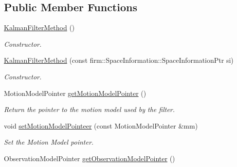 \subsection*{\-Public \-Member \-Functions}
\begin{DoxyCompactItemize}
\item 
\hypertarget{class_kalman_filter_method_a1a3da9af1c9f982195c064c042feab8e}{\hyperlink{class_kalman_filter_method_a1a3da9af1c9f982195c064c042feab8e}{\-Kalman\-Filter\-Method} ()}\label{class_kalman_filter_method_a1a3da9af1c9f982195c064c042feab8e}

\begin{DoxyCompactList}\small\item\em \-Constructor. \end{DoxyCompactList}\item 
\hypertarget{class_kalman_filter_method_a62fd5955112a15d0c5efd1cb0c9601d5}{\hyperlink{class_kalman_filter_method_a62fd5955112a15d0c5efd1cb0c9601d5}{\-Kalman\-Filter\-Method} (const firm\-::\-Space\-Information\-::\-Space\-Information\-Ptr si)}\label{class_kalman_filter_method_a62fd5955112a15d0c5efd1cb0c9601d5}

\begin{DoxyCompactList}\small\item\em \-Constructor. \end{DoxyCompactList}\item 
\hypertarget{class_kalman_filter_method_aed467f00719c58d7be5458f8f99511d9}{\-Motion\-Model\-Pointer \hyperlink{class_kalman_filter_method_aed467f00719c58d7be5458f8f99511d9}{get\-Motion\-Model\-Pointer} ()}\label{class_kalman_filter_method_aed467f00719c58d7be5458f8f99511d9}

\begin{DoxyCompactList}\small\item\em \-Return the pointer to the motion model used by the filter. \end{DoxyCompactList}\item 
\hypertarget{class_kalman_filter_method_a7f2542d72d92f1e44cf4d0cdcaec02b8}{void \hyperlink{class_kalman_filter_method_a7f2542d72d92f1e44cf4d0cdcaec02b8}{set\-Motion\-Model\-Pointeer} (const \-Motion\-Model\-Pointer \&mm)}\label{class_kalman_filter_method_a7f2542d72d92f1e44cf4d0cdcaec02b8}

\begin{DoxyCompactList}\small\item\em \-Set the \-Motion \-Model pointer. \end{DoxyCompactList}\item 
\hypertarget{class_kalman_filter_method_aa93f7e7e297eb337cc1fda8ae46763cc}{\-Observation\-Model\-Pointer \hyperlink{class_kalman_filter_method_aa93f7e7e297eb337cc1fda8ae46763cc}{get\-Observation\-Model\-Pointer} ()}\label{class_kalman_filter_method_aa93f7e7e297eb337cc1fda8ae46763cc}


\end{DoxyCompactItemize}

